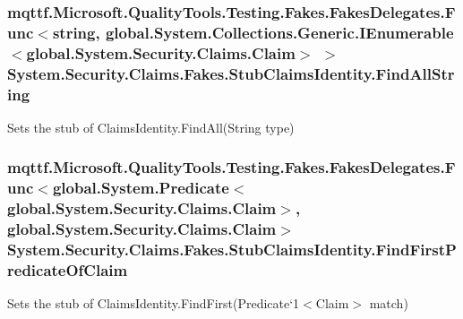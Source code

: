 \hypertarget{class_system_1_1_security_1_1_claims_1_1_fakes_1_1_stub_claims_identity_aefea6aa24e3aae3c10a3de899d213581}{
\subsubsection[{Find\-All\-String}]{\setlength{\rightskip}{0pt plus 5cm}mqttf.\-Microsoft.\-Quality\-Tools.\-Testing.\-Fakes.\-Fakes\-Delegates.\-Func$<$string, global.\-System.\-Collections.\-Generic.\-I\-Enumerable$<$global.\-System.\-Security.\-Claims.\-Claim$>$ $>$ System.\-Security.\-Claims.\-Fakes.\-Stub\-Claims\-Identity.\-Find\-All\-String}}\label{class_system_1_1_security_1_1_claims_1_1_fakes_1_1_stub_claims_identity_aefea6aa24e3aae3c10a3de899d213581}


Sets the stub of Claims\-Identity.\-Find\-All(\-String type)

\hypertarget{class_system_1_1_security_1_1_claims_1_1_fakes_1_1_stub_claims_identity_a5363db3429b26321785426e8931215d2}{
\subsubsection[{Find\-First\-Predicate\-Of\-Claim}]{\setlength{\rightskip}{0pt plus 5cm}mqttf.\-Microsoft.\-Quality\-Tools.\-Testing.\-Fakes.\-Fakes\-Delegates.\-Func$<$global.\-System.\-Predicate$<$global.\-System.\-Security.\-Claims.\-Claim$>$, global.\-System.\-Security.\-Claims.\-Claim$>$ System.\-Security.\-Claims.\-Fakes.\-Stub\-Claims\-Identity.\-Find\-First\-Predicate\-Of\-Claim}}\label{class_system_1_1_security_1_1_claims_1_1_fakes_1_1_stub_claims_identity_a5363db3429b26321785426e8931215d2}


Sets the stub of Claims\-Identity.\-Find\-First(Predicate`1$<$Claim$>$ match)

